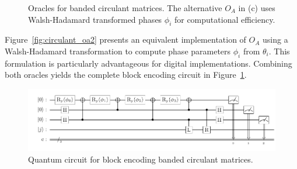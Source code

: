 \documentclass{article}
\begin{document}
    \begin{figure}[htbp]
        \centering
        \caption{Oracles for banded circulant matrices. The alternative $O_A$ in (c) uses Walsh-Hadamard transformed phases $\phi_i$ for computational efficiency.}
    \end{figure}

    Figure~\ref{fig:circulant_oa2} presents an equivalent implementation of $O_A$ using a Walsh-Hadamard transformation to compute phase parameters $\phi_i$ from $\theta_i$. This formulation is particularly advantageous for digital implementations. Combining both oracles yields the complete block encoding circuit in Figure~\ref{fig:circulant_circuit}.

    \begin{figure}[htbp]
        \centering
        \includegraphics{pdf/circulant_circuit}
        \caption{Quantum circuit for block encoding banded circulant matrices.}
        \label{fig:circulant_circuit}
    \end{figure}
\end{document}
